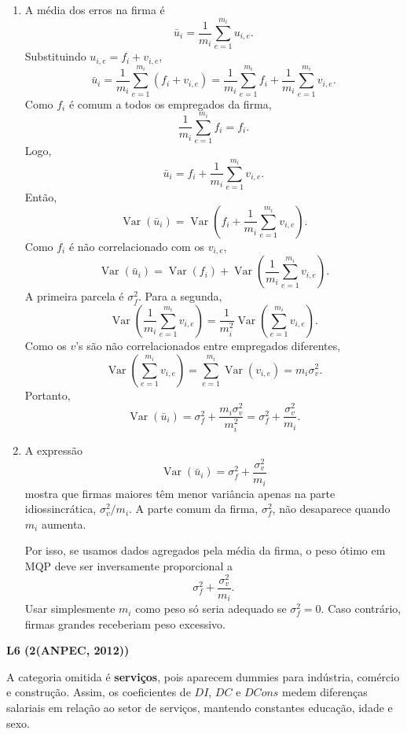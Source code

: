 \documentclass[12pt,letterpaper,onecolumn]{exam}
\begin{document}
\begin{questions}
\begin{enumerate}[label=(\roman*)]
    \item A média dos erros na firma é
    \[
    \bar{u}_i=\frac{1}{m_i}\sum_{e=1}^{m_i}u_{i,e}.
    \]
    Substituindo \(u_{i,e}=f_i+v_{i,e}\),
    \[
    \bar{u}_i
    =
    \frac{1}{m_i}\sum_{e=1}^{m_i}(f_i+v_{i,e})
    =
    \frac{1}{m_i}\sum_{e=1}^{m_i}f_i
    +
    \frac{1}{m_i}\sum_{e=1}^{m_i}v_{i,e}.
    \]
    Como \(f_i\) é comum a todos os empregados da firma,
    \[
    \frac{1}{m_i}\sum_{e=1}^{m_i}f_i=f_i.
    \]
    Logo,
    \[
    \bar{u}_i=f_i+\frac{1}{m_i}\sum_{e=1}^{m_i}v_{i,e}.
    \]
    Então,
    \[
    \operatorname{Var}(\bar{u}_i)
    =
    \operatorname{Var}\left(f_i+\frac{1}{m_i}\sum_{e=1}^{m_i}v_{i,e}\right).
    \]
    Como \(f_i\) é não correlacionado com os \(v_{i,e}\),
    \[
    \operatorname{Var}(\bar{u}_i)
    =
    \operatorname{Var}(f_i)
    +
    \operatorname{Var}\left(\frac{1}{m_i}\sum_{e=1}^{m_i}v_{i,e}\right).
    \]
    A primeira parcela é \(\sigma_f^2\). Para a segunda,
    \[
    \operatorname{Var}\left(\frac{1}{m_i}\sum_{e=1}^{m_i}v_{i,e}\right)
    =
    \frac{1}{m_i^2}\operatorname{Var}\left(\sum_{e=1}^{m_i}v_{i,e}\right).
    \]
    Como os \(v\)'s são não correlacionados entre empregados diferentes,
    \[
    \operatorname{Var}\left(\sum_{e=1}^{m_i}v_{i,e}\right)
    =
    \sum_{e=1}^{m_i}\operatorname{Var}(v_{i,e})
    =
    m_i\sigma_v^2.
    \]
    Portanto,
    \[
    \operatorname{Var}(\bar{u}_i)
    =
    \sigma_f^2+\frac{m_i\sigma_v^2}{m_i^2}
    =
    \sigma_f^2+\frac{\sigma_v^2}{m_i}.
    \]

    \item A expressão
    \[
    \operatorname{Var}(\bar{u}_i)=\sigma_f^2+\frac{\sigma_v^2}{m_i}
    \]
    mostra que firmas maiores têm menor variância apenas na parte idiossincrática, \(\sigma_v^2/m_i\). A parte comum da firma, \(\sigma_f^2\), não desaparece quando \(m_i\) aumenta.

    Por isso, se usamos dados agregados pela média da firma, o peso ótimo em MQP deve ser inversamente proporcional a
    \[
    \sigma_f^2+\frac{\sigma_v^2}{m_i}.
    \]
    Usar simplesmente \(m_i\) como peso só seria adequado se \(\sigma_f^2=0\). Caso contrário, firmas grandes receberiam peso excessivo.
\end{enumerate}

\vspace{0.8cm}

\question \textbf{L6 (2(ANPEC, 2012))}

A categoria omitida é \textbf{serviços}, pois aparecem dummies para indústria, comércio e construção. Assim, os coeficientes de \(DI\), \(DC\) e \(DCons\) medem diferenças salariais em relação ao setor de serviços, mantendo constantes educação, idade e sexo.


\end{questions}
\end{document}
